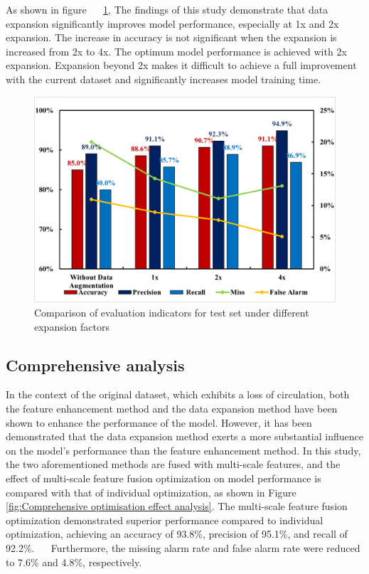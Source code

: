 \documentclass[journal,article,submit,pdftex,moreauthors]{Definitions/mdpi}
\begin{document}
As shown in figure    \ref{fig:Analysis of the effect of data expansion}, The findings of this study demonstrate that data expansion significantly improves model performance, especially at 1x and 2x expansion. The increase in accuracy is not significant when the expansion is increased from 2x to 4x. The optimum model performance is achieved with 2x expansion. Expansion beyond 2x makes it difficult to achieve a full improvement with the current dataset and significantly increases model training time.

\begin{figure}[H]
    \centering
    \includegraphics[width=0.75\linewidth]{图片/数据扩充.png}
    \caption{Comparison of evaluation indicators for test set under different expansion factors}
    \label{fig:Analysis of the effect of data expansion}
\end{figure}


\subsection{Comprehensive analysis}

In the context of the original dataset, which exhibits a loss of circulation, both the feature enhancement method and the data expansion method have been shown to enhance the performance of the model. However, it has been demonstrated that the data expansion method exerts a more substantial influence on the model's performance than the feature enhancement method. In this study, the two aforementioned methods are fused with multi-scale features, and the effect of multi-scale feature fusion optimization on model performance is compared with that of individual optimization, as shown in Figure \ref{fig:Comprehensive optimisation effect analysis}. The multi-scale feature fusion optimization demonstrated superior performance compared to individual optimization, achieving an accuracy of 93.8\%, precision of 95.1\%, and recall of 92.2\%.    Furthermore, the missing alarm rate and false alarm rate were reduced to 7.6\% and 4.8\%, respectively.  
\end{document}
